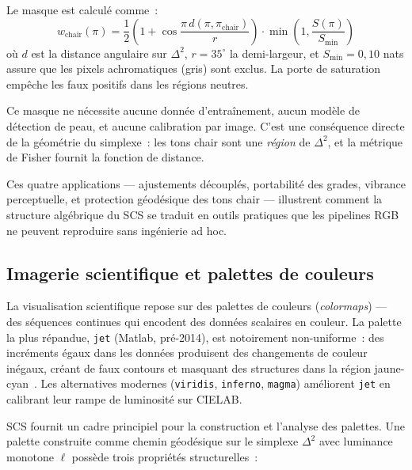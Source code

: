 \documentclass[12pt,a4paper]{article}
\begin{document}
Le masque est calcul\'e comme~:
\[
  w_\mathrm{chair}(\pi) = \frac{1}{2}\left(1 + \cos\frac{\pi\, d(\pi, \pi_\mathrm{chair})}{r}\right) \cdot \min\!\left(1, \frac{S(\pi)}{S_\mathrm{min}}\right)
\]
o\`u $d$ est la distance angulaire sur $\Delta^2$, $r = 35^\circ$ la
demi-largeur, et $S_\mathrm{min} = 0{,}10$ nats assure que les pixels
achromatiques (gris) sont exclus. La porte de saturation emp\^eche les
faux positifs dans les r\'egions neutres.

Ce masque ne n\'ecessite aucune donn\'ee d'entra\^inement, aucun
mod\`ele de d\'etection de peau, et aucune calibration par image.
C'est une cons\'equence directe de la g\'eom\'etrie du simplexe~: les
tons chair sont une \emph{r\'egion} de $\Delta^2$, et la m\'etrique de
Fisher fournit la fonction de distance.

\medskip

Ces quatre applications --- ajustements d\'ecoupl\'es, portabilit\'e
des grades, vibrance perceptuelle, et protection g\'eod\'esique des
tons chair --- illustrent comment la structure alg\'ebrique du SCS se
traduit en outils pratiques que les pipelines RGB ne peuvent reproduire
sans ing\'enierie ad hoc.

\subsection{Imagerie scientifique et palettes de couleurs}

La visualisation scientifique repose sur des palettes de couleurs
(\emph{colormaps}) --- des s\'equences continues qui encodent des
donn\'ees scalaires en couleur. La palette la plus r\'epandue,
\texttt{jet} (Matlab, pr\'e-2014), est notoirement non-uniforme~: des
incr\'ements \'egaux dans les donn\'ees produisent des changements de
couleur in\'egaux, cr\'eant de faux contours et masquant des
structures dans la r\'egion jaune-cyan~\cite{borland2007}. Les
alternatives modernes (\texttt{viridis}, \texttt{inferno},
\texttt{magma}) am\'eliorent \texttt{jet} en calibrant leur rampe de
luminosit\'e sur CIELAB.

SCS fournit un cadre principiel pour la construction et l'analyse des
palettes. Une palette construite comme chemin g\'eod\'esique sur le
simplexe $\Delta^2$ avec luminance monotone $\ell$ poss\`ede trois
propri\'et\'es structurelles~:
\end{document}
